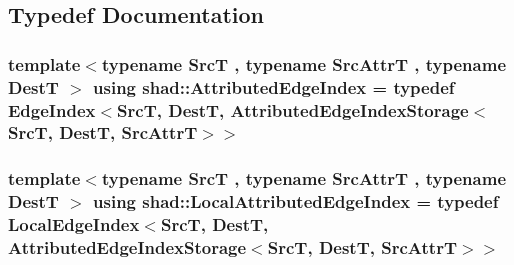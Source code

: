 \subsection{Typedef Documentation}
\hypertarget{namespaceshad_a4fcdd0f79705e26acfcc087f7299e70e}{
\subsubsection[{Attributed\-Edge\-Index}]{\setlength{\rightskip}{0pt plus 5cm}template$<$typename Src\-T , typename Src\-Attr\-T , typename Dest\-T $>$ using {\bf shad\-::\-Attributed\-Edge\-Index} = typedef {\bf Edge\-Index}$<$Src\-T, Dest\-T, {\bf Attributed\-Edge\-Index\-Storage}$<$Src\-T, Dest\-T, Src\-Attr\-T$>$$>$}}\label{namespaceshad_a4fcdd0f79705e26acfcc087f7299e70e}
\hypertarget{namespaceshad_a1c829d1964a31a103acef7260a679a67}{
\subsubsection[{Local\-Attributed\-Edge\-Index}]{\setlength{\rightskip}{0pt plus 5cm}template$<$typename Src\-T , typename Src\-Attr\-T , typename Dest\-T $>$ using {\bf shad\-::\-Local\-Attributed\-Edge\-Index} = typedef {\bf Local\-Edge\-Index}$<$Src\-T, Dest\-T, {\bf Attributed\-Edge\-Index\-Storage}$<$Src\-T, Dest\-T, Src\-Attr\-T$>$$>$}}\label{namespaceshad_a1c829d1964a31a103acef7260a679a67}


